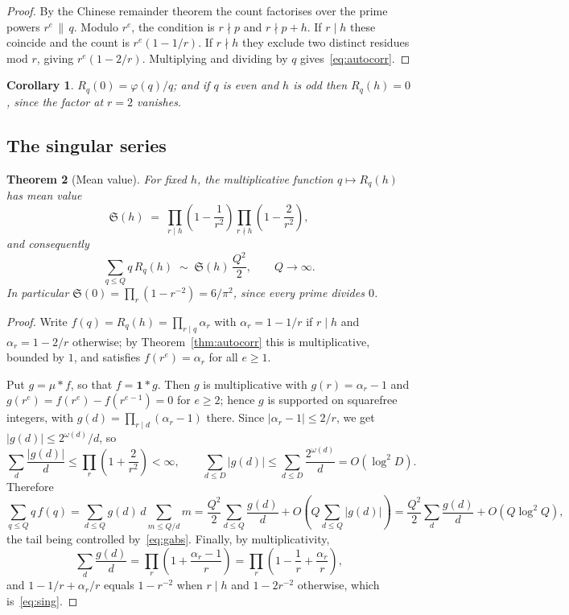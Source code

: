 \documentclass[11pt,a4paper]{article}
\theoremstyle{plain}
\newtheorem{theorem}{Theorem}[section]
\newtheorem{corollary}[theorem]{Corollary}
\theoremstyle{definition}
\theoremstyle{remark}
\begin{document}
\begin{proof}
By the Chinese remainder theorem the count factorises over the prime powers
$r^e \,\|\, q$. Modulo $r^e$, the condition is $r \nmid p$ and $r \nmid p+h$. If
$r \mid h$ these coincide and the count is $r^e(1-1/r)$. If $r \nmid h$ they
exclude two distinct residues mod $r$, giving $r^e(1-2/r)$. Multiplying and
dividing by $q$ gives~\eqref{eq:autocorr}.
\end{proof}

\begin{corollary}
$R_q(0) = \varphi(q)/q$; and if $q$ is even and $h$ is odd then $R_q(h) = 0$,
since the factor at $r=2$ vanishes.
\end{corollary}

\subsection{The singular series}

\begin{theorem}[Mean value]\label{thm:singular}
For fixed $h$, the multiplicative function $q \mapsto R_q(h)$ has mean value
\begin{equation}\label{eq:sing}
  \mathfrak{S}(h) \;=\; \prod_{r \mid h}\left(1 - \frac{1}{r^2}\right)
                        \prod_{r \nmid h}\left(1 - \frac{2}{r^2}\right),
\end{equation}
and consequently
\[
  \sum_{q \le Q} q\,R_q(h) \;\sim\; \mathfrak{S}(h)\,\frac{Q^2}{2},
  \qquad Q \to \infty .
\]
In particular $\mathfrak{S}(0) = \prod_r (1 - r^{-2}) = 6/\pi^2$, since every
prime divides $0$.
\end{theorem}

\begin{proof}
Write $f(q) = R_q(h) = \prod_{r \mid q} \alpha_r$ with $\alpha_r = 1 - 1/r$ if
$r \mid h$ and $\alpha_r = 1 - 2/r$ otherwise; by Theorem~\ref{thm:autocorr}
this is multiplicative, bounded by $1$, and satisfies $f(r^e) = \alpha_r$ for
all $e \ge 1$.

Put $g = \mu * f$, so that $f = \mathbf{1} * g$. Then $g$ is multiplicative with
$g(r) = \alpha_r - 1$ and $g(r^e) = f(r^e) - f(r^{e-1}) = 0$ for $e \ge 2$;
hence $g$ is supported on squarefree integers, with
$g(d) = \prod_{r \mid d}(\alpha_r - 1)$ there. Since
$|\alpha_r - 1| \le 2/r$, we get $|g(d)| \le 2^{\omega(d)}/d$, so
\begin{equation}\label{eq:gabs}
  \sum_{d} \frac{|g(d)|}{d} \le \prod_r \left(1 + \frac{2}{r^2}\right) < \infty,
  \qquad \sum_{d \le D} |g(d)| \le \sum_{d\le D} \frac{2^{\omega(d)}}{d} = O(\log^2 D).
\end{equation}
Therefore
\[
  \sum_{q \le Q} q\, f(q)
  = \sum_{d \le Q} g(d)\, d \sum_{m \le Q/d} m
  = \frac{Q^2}{2} \sum_{d \le Q} \frac{g(d)}{d}
    + O\!\left( Q \sum_{d\le Q} |g(d)| \right)
  = \frac{Q^2}{2} \sum_{d} \frac{g(d)}{d} + O(Q \log^2 Q),
\]
the tail being controlled by~\eqref{eq:gabs}. Finally, by multiplicativity,
\[
  \sum_{d} \frac{g(d)}{d}
  = \prod_r \left(1 + \frac{\alpha_r - 1}{r}\right)
  = \prod_r \left(1 - \frac1r + \frac{\alpha_r}{r}\right),
\]
and $1 - 1/r + \alpha_r/r$ equals $1 - r^{-2}$ when $r \mid h$ and $1 - 2r^{-2}$
otherwise, which is~\eqref{eq:sing}.
\end{proof}
\end{document}
